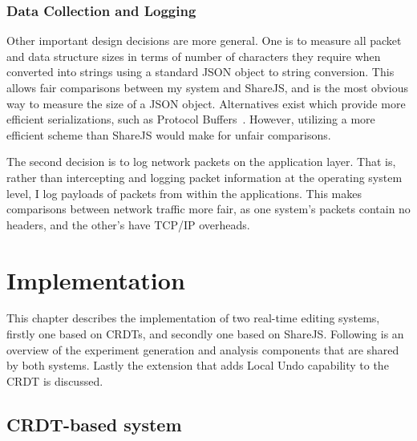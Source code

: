 \documentclass[12pt,a4paper,twoside,openright]{report}
\begin{document}

	\subsection{Data Collection and Logging} \label{sec:datacollectiondecisions}
	
	
	Other important design decisions are more general. One is to measure all packet and data structure sizes in terms of number of characters they require when converted into strings using a standard JSON object to string conversion. This allows fair comparisons between my system and ShareJS, and is the most obvious way to measure the size of a JSON object. Alternatives exist which provide more efficient serializations, such as Protocol Buffers~\cite{protobuf}. However, utilizing a more efficient scheme than ShareJS would make for unfair comparisons.
	
	The second decision is to log network packets on the application layer. That is, rather than intercepting and logging packet information at the operating system level, I log payloads of packets from within the applications. This makes comparisons between network traffic more fair, as one system's packets contain no headers, and the other's have TCP/IP overheads.



\chapter{Implementation} \label{sec:implementation}

This chapter describes the implementation of two real-time editing systems, firstly one based on CRDTs, and secondly one based on ShareJS. Following is an overview of the experiment generation and analysis components that are shared by both systems. Lastly the extension that adds Local Undo capability to the CRDT is discussed.


\section{CRDT-based system} \label{sec:crdt}
\end{document}
